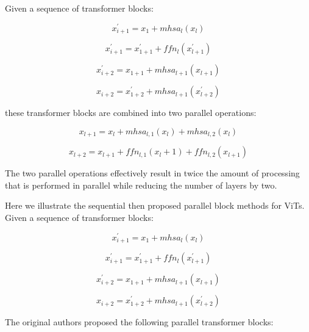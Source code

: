 \documentclass[10pt,twocolumn,letterpaper]{article}
\begin{document}
Given a sequence of transformer blocks:

\begin{equation}
x^{'}_{i+1} = x_1 + mhsa_l(x_l)
\end{equation}

\begin{equation}
x^{'}_{i+1} = x^{'}_{1+1} + ffn_l(x^{'}_{l+1})
\end{equation}

\begin{equation}
x^{'}_{i+2} = x_{1+1} + mhsa_{l+1}(x_{l+1})
\end{equation}

\begin{equation}
x_{i+2} = x^{'}_{1+2} + mhsa_{l+1}(x^{'}_{l+2})
\end{equation}

these transformer blocks are combined into two parallel operations:

\begin{equation}
x_{l+1} = x_{l} + mhsa_{l,1}(x_l) + mhsa_{l,2}(x_l)
\end{equation}

\begin{equation}
x_{l+2} = x_{l+1} + ffn_{l,1}(x_l+1) + ffn_{l,2}(x_{l+1})
\end{equation}


The two parallel operations effectively result in twice the amount of processing that is performed in parallel while reducing the number of layers by two.

Here we illustrate the sequential then proposed parallel block methods for ViTs. Given a sequence of transformer blocks:

\begin{equation}
x^{'}_{i+1} = x_1 + mhsa_l(x_l)
\end{equation}

\begin{equation}
x^{'}_{i+1} = x^{'}_{1+1} + ffn_l(x^{'}_{l+1})
\end{equation}

\begin{equation}
x^{'}_{i+2} = x_{1+1} + mhsa_{l+1}(x_{l+1})
\end{equation}

\begin{equation}
x_{i+2} = x^{'}_{1+2} + mhsa_{l+1}(x^{'}_{l+2})
\end{equation}

The original authors proposed the following parallel transformer blocks:
\end{document}
